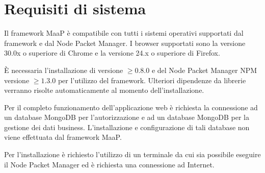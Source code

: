 \section{Requisiti di sistema}

Il framework MaaP è compatibile con tutti i sistemi operativi supportati dal framework  e dal Node Packet Manager. I browser supportati sono la versione 30.0x o superiore di Chrome e la versione 24.x o superiore di Firefox.

È necessaria l'installazione di  versione $\geq 0.8.0$ e del Node Packet Manager NPM versione $\geq 1.3.0$ per l'utilizzo del framework. Ulteriori dipendenze da librerie verranno risolte automaticamente al momento dell'installazione.

Per il completo funzionamento dell'applicazione web è richiesta la connessione ad un database MongoDB per l'autorizzazione e ad un database MongoDB per la gestione dei dati business. L'installazione e configurazione di tali database non viene effettuata dal framework MaaP.

Per l'installazione è richiesto l'utilizzo di un terminale da cui sia possibile eseguire il Node Packet Manager ed è richiesta una connessione ad Internet.
